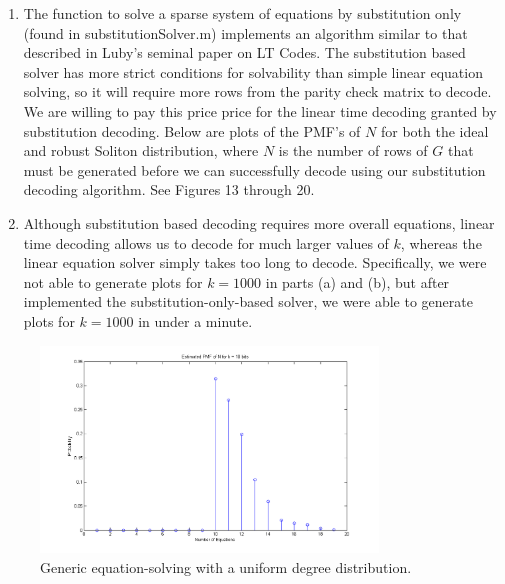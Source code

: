 \documentclass[11pt]{article}
\begin{document}
\begin{enumerate}
\begin{enumerate}
        \item The function to solve a sparse system of equations by substitution only (found in substitutionSolver.m) implements an algorithm similar to that described in Luby's seminal paper on LT Codes. The substitution based solver has more strict conditions for solvability than simple linear equation solving, so it will require more rows from the parity check matrix to decode. We are willing to pay this price price for the linear time decoding granted by substitution decoding. Below are plots of the PMF's of $N$ for both the ideal and robust Soliton distribution, where $N$ is the number of rows of $G$ that must be generated before we can successfully decode using our substitution decoding algorithm. See Figures 13 through 20.




        \item Although substitution based decoding requires more overall equations, linear time decoding allows us to decode for much larger values of $k$, whereas the linear equation solver simply takes too long to decode. Specifically, we were not able to generate plots for $k = 1000$ in parts (a) and (b), but after implemented the substitution-only-based solver, we were able to generate plots for $k = 1000$ in under a minute.
            
            \newpage




    \end{enumerate}


    \begin{figure}[H]
        \begin{center}
            \includegraphics[width = 0.8\textwidth]{figure_1a_k10.png}
            \caption{Generic equation-solving with a uniform degree distribution.}
        \end{center}
    \end{figure}


\end{enumerate}
\end{document}
